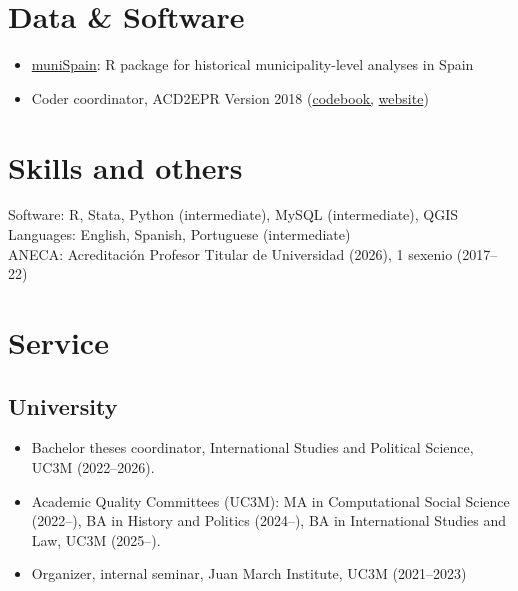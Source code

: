 \documentclass[a4paper, 12pt]{article}
\begin{document}
\section*{Data \& Software}

\begin{itemize}[leftmargin=*, nolistsep]
  \item \href{https://github.com/franvillamil/muniSpain}{muniSpain}: R package for historical municipality-level analyses in Spain
	\item Coder coordinator, ACD2EPR Version 2018 (\href{https://icr.ethz.ch/data/epr/acd2epr/ACD2EPR-2018_Codebook.pdf}{codebook,} \href{https://icr.ethz.ch/data/epr/acd2epr/}{website})
\end{itemize}

\section*{Skills and others}

Software: R, Stata, Python (intermediate), MySQL (intermediate), QGIS\\
Languages: English, Spanish, Portuguese (intermediate)\\
ANECA: Acreditación Profesor Titular de Universidad (2026), 1 sexenio (2017--22)

\section*{Service}

\subsection*{University}

\begin{itemize}[leftmargin=*, nolistsep]
  \item Bachelor theses coordinator, International Studies and Political Science, UC3M (2022--2026).
	\item Academic Quality Committees (UC3M): MA in Computational Social Science (2022--), BA in History and Politics (2024--), BA in International Studies and Law, UC3M (2025--).
	\item Organizer, internal seminar, Juan March Institute, UC3M (2021--2023)
\end{itemize}
\end{document}
